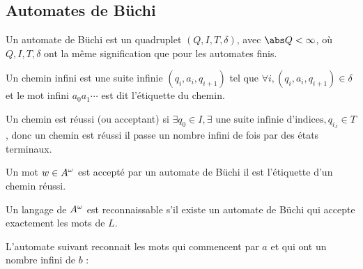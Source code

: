 \subsection{Automates de Büchi}

\begin{definition}
	Un automate de Büchi est un quadruplet $(Q,I,T,\delta)$, avec $\abs Q < \infty$, où
	$Q,I,T,\delta$ ont la même signification que pour les automates finis.
\end{definition}

\begin{definition}
	Un chemin infini est une suite infinie $(q_i,a_i,q_{i+1})$ tel que $\forall i, (q_i,a_i,q_{i+1}) \in \delta$ et le mot
	infini $a_0a_1\cdots$ est dit l'étiquette du chemin.
\end{definition}


\begin{definition}
	Un chemin est réussi (ou acceptant) si $\exists q_0 \in I, \exists \text{ une suite infinie d'indices}, q_{i_J} \in T$,
	donc un chemin est réussi \ssi il passe un nombre infini de fois par des états terminaux.
\end{definition}

\begin{definition}
	Un mot $w \in A^{\omega}$ est accepté par un automate de Büchi \ssi il est l'étiquette d'un chemin réussi.
\end{definition}


\begin{definition}
	Un langage de $A^{\omega}$ est reconnaissable s'il existe un automate de Büchi qui accepte exactement les mots de $L$.
\end{definition}


\begin{exemple}
	L'automate suivant reconnait les mots qui commencent par $a$ et qui ont un nombre infini de $b$ :

\end{exemple}


